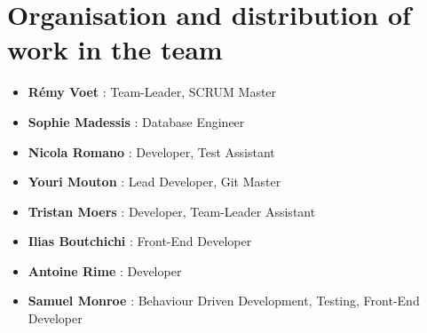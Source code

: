 \documentclass{article}
\begin{document}
\section{Organisation and distribution of work in the team}

    \begin{itemize}

        \item \textbf{Rémy Voet} : Team-Leader, SCRUM Master
        \item \textbf{Sophie Madessis} : Database Engineer
        \item \textbf{Nicola Romano} : Developer, Test Assistant
        \item \textbf{Youri Mouton} : Lead Developer, Git Master
        \item \textbf{Tristan Moers} : Developer, Team-Leader Assistant
        \item \textbf{Ilias Boutchichi} : Front-End Developer
        \item \textbf{Antoine Rime} : Developer
        \item \textbf{Samuel Monroe} : Behaviour Driven Development, Testing, Front-End Developer
    \end{itemize}
\end{document}
